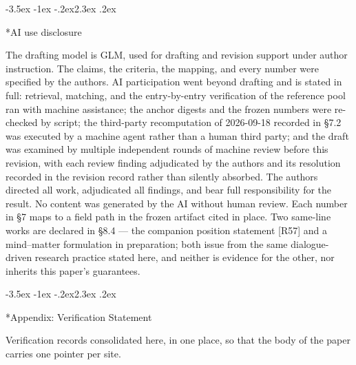 \documentclass[11pt,a4paper]{article}
\makeatletter
\renewcommand\section{\@startsection{section}{1}{\z@}%
  {-3.5ex \@plus -1ex \@minus -.2ex}{2.3ex \@plus .2ex}%
  {\normalfont\Large\bfseries\raggedright}}
\makeatother
\begin{document}
\section*{AI use disclosure}

The drafting model is GLM, used for drafting and revision support under author instruction. The claims, the criteria, the mapping, and every number were specified by the authors. AI participation went beyond drafting and is stated in full: retrieval, matching, and the entry-by-entry verification of the reference pool ran with machine assistance; the anchor digests and the frozen numbers were re-checked by script; the third-party recomputation of 2026-09-18 recorded in §7.2 was executed by a machine agent rather than a human third party; and the draft was examined by multiple independent rounds of machine review before this revision, with each review finding adjudicated by the authors and its resolution recorded in the revision record rather than silently absorbed. The authors directed all work, adjudicated all findings, and bear full responsibility for the result. No content was generated by the AI without human review. Each number in §7 maps to a field path in the frozen artifact cited in place. Two same-line works are declared in §8.4 — the companion position statement [R57] and a mind--matter formulation in preparation; both issue from the same dialogue-driven research practice stated here, and neither is evidence for the other, nor inherits this paper's guarantees.

\section*{Appendix: Verification Statement}

Verification records consolidated here, in one place, so that the body of the paper carries one pointer per site.
\end{document}
